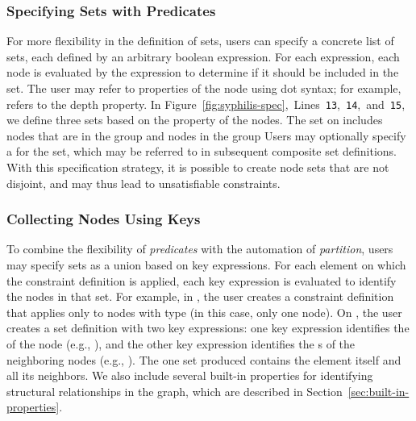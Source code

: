 \subsubsection{Specifying Sets with Predicates}
For more flexibility in the definition of sets, users
can specify a concrete list of sets, each defined by an arbitrary boolean
expression. For each expression, each node is evaluated by the expression
to determine if it should be included in the set. The user may
refer to properties of the node using dot syntax; for example,
 refers to the depth property. In 
Figure~\ref{fig:syphilis-spec},~Lines~\texttt{13},~\texttt{14},~and~\texttt{15},
we define three sets based on the  property of the nodes.
The set on  includes nodes that are in the group 
 and nodes in the group 
Users may optionally specify a  for the set, which may be 
referred to in subsequent composite set definitions. With this specification 
strategy, it is possible to create node sets that are not disjoint, 
and may thus lead to unsatisfiable constraints.

\subsubsection{Collecting Nodes Using Keys}
To combine the flexibility of \emph{predicates} with the automation of 
\emph{partition}, users may specify sets as a union based on key expressions.
For each element on which the constraint definition is applied, each key expression is
evaluated to identify the nodes in that set.
For example, in , the 
user creates a constraint definition that applies only to nodes with type
 (in this case, only one node). On , the user 
creates a set definition with two key expressions: one key expression identifies
the  of the node (e.g., ), and the other 
key expression identifies the s of the neighboring nodes 
(e.g., ). The one set produced
contains the element itself and all its neighbors. We also include several 
built-in properties for identifying structural relationships in the 
graph, which are described in Section~\ref{sec:built-in-properties}.

